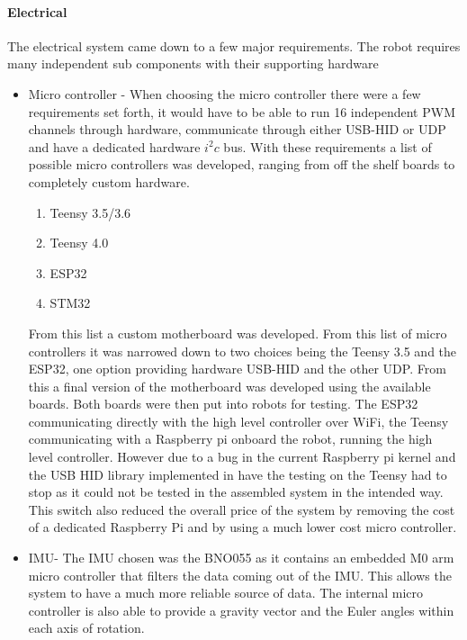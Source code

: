 \documentclass[conference]{IEEEtran}
\begin{document}
\paragraph*{Electrical}
The electrical system came down to a few major requirements. The robot requires many independent sub components with their supporting hardware

    \begin{itemize}
        \item Micro controller -
            When choosing the micro controller there were a few requirements set forth, it would have to be able to run 16 independent PWM channels through hardware, communicate through either USB-HID or UDP and have a dedicated hardware $i^2c$ bus. With these requirements a list of possible micro controllers was developed, ranging from off the shelf boards to completely custom hardware.
            \begin{enumerate}
                \item Teensy 3.5/3.6
                \item Teensy 4.0
                \item ESP32
                \item STM32
            \end{enumerate}
            From this list a custom motherboard was developed. From this list of micro controllers it was narrowed down to two choices being the Teensy 3.5 and the ESP32, one option providing hardware USB-HID and the other UDP. From this a final version of the motherboard was developed using the available boards. Both boards were then put into robots for testing. The ESP32 communicating directly with the high level controller over WiFi, the Teensy communicating with a Raspberry pi onboard the robot, running the high level controller. However due to a bug in the current Raspberry pi kernel and the USB HID library implemented in have the testing on the Teensy had to stop as it could not be tested in the assembled system in the intended way. This switch also reduced the overall price of the system by removing the cost of a dedicated Raspberry Pi and by using a much lower cost micro controller.\newline
            
        \item IMU- 
            The IMU chosen was the BNO055 as it contains an embedded M0 arm micro controller that filters the data coming out of the IMU. This allows the system to have a much more reliable source of data. The internal micro controller is also able to provide a gravity vector and the Euler angles within each axis of rotation.\newline
            

\end{itemize}
\end{document}
